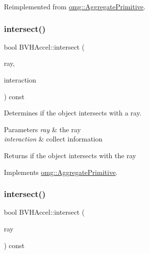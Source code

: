 Reimplemented from \mbox{\hyperlink{classomg_1_1_aggregate_primitive_a339e9fe3ab8e2c0c68c888345b834c21}{omg\+::\+Aggregate\+Primitive}}.

\mbox{\label{classomg_1_1_b_v_h_accel_a368b5156d04fdac833f8c9917f13d91e}} 
\subsubsection{\texorpdfstring{intersect()}{intersect()}\hspace{0.1cm}{\footnotesize\ttfamily [1/2]}}
{\footnotesize\ttfamily bool B\+V\+H\+Accel\+::intersect (\begin{DoxyParamCaption}\item[{const \mbox{\hyperlink{classomg_1_1_ray}{Ray}} \&}]{ray,  }\item[{\mbox{\hyperlink{classomg_1_1_surface_interaction}{Surface\+Interaction}} $\ast$}]{interaction }\end{DoxyParamCaption}) const\hspace{0.3cm}{\ttfamily [virtual]}}



Determines if the object intersects with a ray. 


\begin{DoxyParams}{Parameters}
{\em ray} & the ray \\
\hline
{\em interaction} & collect information \\
\hline
\end{DoxyParams}
\begin{DoxyReturn}{Returns}
if the object intersects with the ray 
\end{DoxyReturn}


Implements \mbox{\hyperlink{classomg_1_1_aggregate_primitive_a07ab041d9071295e4f648475c7163470}{omg\+::\+Aggregate\+Primitive}}.

\mbox{\label{classomg_1_1_b_v_h_accel_a110cd424f8f4d628668cb500ff3c6e7a}} 
\subsubsection{\texorpdfstring{intersect()}{intersect()}\hspace{0.1cm}{\footnotesize\ttfamily [2/2]}}
{\footnotesize\ttfamily bool B\+V\+H\+Accel\+::intersect (\begin{DoxyParamCaption}\item[{const \mbox{\hyperlink{classomg_1_1_ray}{Ray}} \&}]{ray }\end{DoxyParamCaption}) const\hspace{0.3cm}{\ttfamily [virtual]}}



